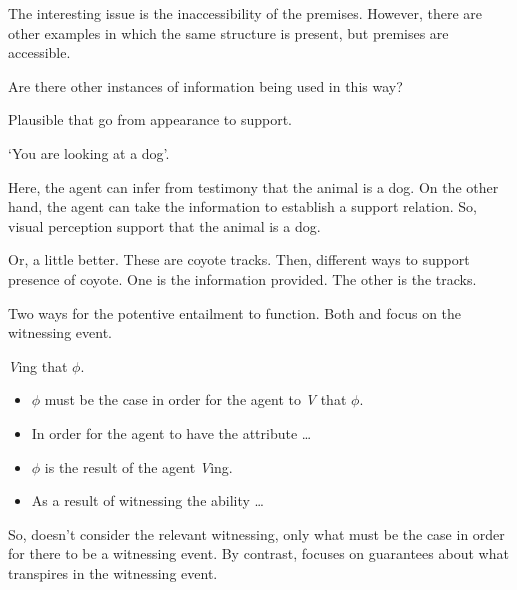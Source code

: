 \begin{note}
  The interesting issue is the inaccessibility of the premises.
  However, there are other examples in which the same structure is present, but premises are accessible.
  
  Are there other instances of information being used in this way?

  Plausible that go from appearance to support.

  `You are looking at a dog'.

  Here, the agent can infer from testimony that the animal is a dog.
  On the other hand, the agent can take the information to establish a support relation.
  So, visual perception support that the animal is a dog.

  Or, a little better.
  These are coyote tracks.
  Then, different ways to support presence of coyote.
  One is the information provided.
  The other is the tracks.
\end{note}

\begin{note}
  Two ways for the potentive entailment to function.
  Both \AR{} and \WR{} focus on the witnessing event.

  \emph{V}ing that \(\phi\).
  \begin{itemize}
  \item \(\phi\) must be the case in order for the agent to \emph{V} that \(\phi\).
  \item In order for the agent to have the attribute \dots
  \item \(\phi\) is the result of the agent \emph{V}ing.
  \item As a result of witnessing the ability \dots
  \end{itemize}

  So, \AR{} doesn't consider the relevant witnessing, only what must be the case in order for there to be a witnessing event.
  By contrast, \WR{} focuses on guarantees about what transpires in the witnessing event.
\end{note}

